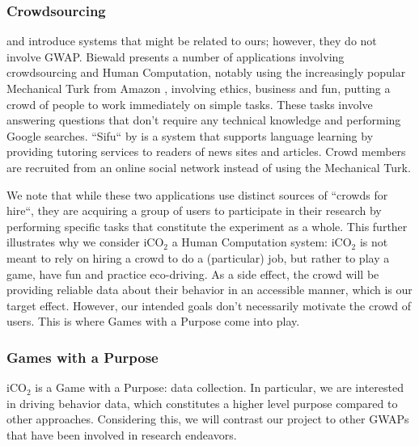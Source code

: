 \documentclass[preprint,authoryear,12pt]{elsarticle}
\makeatletter
\renewcommand{\paragraph}{\@startsection{paragraph}{4}{\z@}%
  {-3.25ex\@plus -1ex \@minus -.2ex}%
  {1.5ex \@plus .2ex}%
  {\normalfont\normalsize\mdseries}}
\newcommand{\commentHidden}[1]{}  %
\newcommand{\commentShow}[1] {} %
\makeatother
\begin{document}
\subsubsection{Crowdsourcing}

\cite{Biewald:2012} and \citep{ChanH12} introduce systems that might be related to ours; however, they do not involve GWAP. Biewald presents a number of applications involving crowdsourcing and Human Computation, notably using the increasingly popular Mechanical Turk from Amazon \citep{MechTurk}, involving ethics, business and fun, putting a crowd of people to work immediately on simple tasks. These tasks involve answering questions that don't require any technical knowledge and performing Google searches. ``Sifu`` by \citep{ChanH12} is a system that supports language learning by providing tutoring services to readers of news sites and articles. Crowd members are recruited from an online social network instead of using the Mechanical Turk.

We note that while these two applications use distinct sources of ``crowds for hire``, they are acquiring a group of users to participate in their research by performing specific tasks that constitute the experiment as a whole. This further illustrates why we consider iCO$_2$ a Human Computation system: iCO$_2$ is not meant to rely on hiring a crowd to do a (particular) job, but rather to play a game, have fun and practice eco-driving. As a side effect, the crowd will be providing reliable data about their behavior in an accessible manner, which is our target effect. However, our intended goals don't necessarily motivate the crowd of users. This is where Games with a Purpose come into play.

\subsubsection{Games with a Purpose}

\commentShow{This section describes a lot of GWAP however such a detailed description is not needed.}


iCO$_2$ is a Game with a Purpose: data collection. In particular, we are interested in driving behavior data, which constitutes a higher level purpose compared to other approaches. \commentHidden{what other approaches? } Considering this, we will contrast our project to other GWAPs that have been involved in research endeavors. \commentShow{endeavors for what ?}

\end{document}
